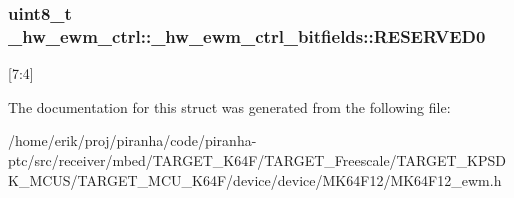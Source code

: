 \subsubsection[{\texorpdfstring{R\+E\+S\+E\+R\+V\+E\+D0}{RESERVED0}}]{\setlength{\rightskip}{0pt plus 5cm}uint8\+\_\+t \+\_\+hw\+\_\+ewm\+\_\+ctrl\+::\+\_\+hw\+\_\+ewm\+\_\+ctrl\+\_\+bitfields\+::\+R\+E\+S\+E\+R\+V\+E\+D0}\hypertarget{struct__hw__ewm__ctrl_1_1__hw__ewm__ctrl__bitfields_adfb09e8eeb56ae347b0214413d9d25a8}{}\label{struct__hw__ewm__ctrl_1_1__hw__ewm__ctrl__bitfields_adfb09e8eeb56ae347b0214413d9d25a8}
\mbox{[}7\+:4\mbox{]} 

The documentation for this struct was generated from the following file\+:\begin{DoxyCompactItemize}
\item 
/home/erik/proj/piranha/code/piranha-\/ptc/src/receiver/mbed/\+T\+A\+R\+G\+E\+T\+\_\+\+K64\+F/\+T\+A\+R\+G\+E\+T\+\_\+\+Freescale/\+T\+A\+R\+G\+E\+T\+\_\+\+K\+P\+S\+D\+K\+\_\+\+M\+C\+U\+S/\+T\+A\+R\+G\+E\+T\+\_\+\+M\+C\+U\+\_\+\+K64\+F/device/device/\+M\+K64\+F12/M\+K64\+F12\+\_\+ewm.\+h\end{DoxyCompactItemize}
